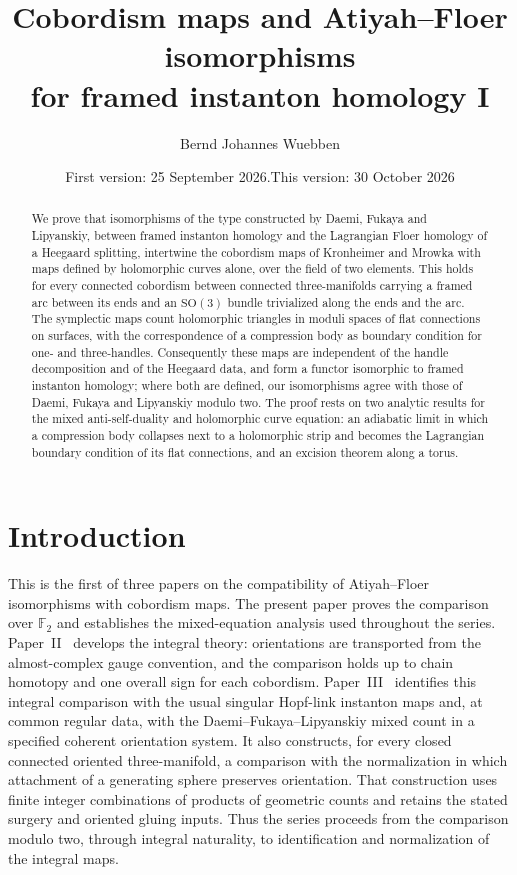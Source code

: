 \documentclass[11pt]{amsart}
\title[Atiyah--Floer cobordism maps I]{Cobordism maps
and Atiyah--Floer isomorphisms\\ for framed instanton homology I}
\author{Bernd Johannes Wuebben}
\date{First version: 25 September 2026.\newline This version: 30 October 2026}
\theoremstyle{definition}
\theoremstyle{remark}
\theoremstyle{plain}
\numberwithin{equation}{section}
\newcommand{\FF}{\mathbb{F}_2}
\newcommand{\SO}{\mathrm{SO}}
\begin{document}
\begin{abstract}
We prove that isomorphisms of the type constructed by Daemi, Fukaya and Lipyanskiy, between
framed instanton homology and the Lagrangian Floer homology of a Heegaard splitting,
intertwine the cobordism maps of Kronheimer and Mrowka with maps defined by holomorphic
curves alone, over the field of two elements. This holds for every connected cobordism
between connected three-manifolds carrying a framed arc between its ends and an $\SO(3)$
bundle trivialized along the ends and the arc. The symplectic maps count holomorphic triangles in
moduli spaces of flat connections on surfaces, with the correspondence of a compression body
as boundary condition for one- and three-handles. Consequently these maps are independent of the handle decomposition and of the
Heegaard data, and form a functor isomorphic to framed instanton homology; where both are
defined, our isomorphisms agree with those of Daemi, Fukaya and Lipyanskiy modulo two. The
proof rests on two analytic results for the mixed anti-self-duality and holomorphic curve
equation: an adiabatic limit in which a compression body collapses next to a holomorphic strip
and becomes the Lagrangian boundary condition of its flat connections, and an excision theorem
along a torus.
\end{abstract}

\maketitle

\setcounter{tocdepth}{1}
\newpage
\tableofcontents
\newpage

\section{Introduction}\label{sec:intro}

This is the first of three papers on the compatibility of Atiyah--Floer
isomorphisms with cobordism maps. The present paper proves the comparison
over $\FF$ and establishes the mixed-equation analysis used throughout
the series. Paper~II~\cite{Wuebben-II} develops the integral theory:
orientations are transported from the almost-complex gauge convention,
and the comparison holds up to chain homotopy and one overall sign for
each cobordism. Paper~III~\cite{Wuebben-III} identifies this integral
comparison with the usual singular Hopf-link instanton maps and, at
common regular data, with the Daemi--Fukaya--Lipyanskiy mixed count in
a specified coherent orientation system. It also constructs, for every
closed connected oriented three-manifold, a comparison with the
normalization in which attachment of a generating sphere preserves
orientation. That construction uses finite integer combinations of
products of geometric counts and retains the stated surgery and
oriented gluing inputs. Thus the series proceeds from the comparison
modulo two, through integral naturality, to identification and
normalization of the integral maps.
\end{document}
